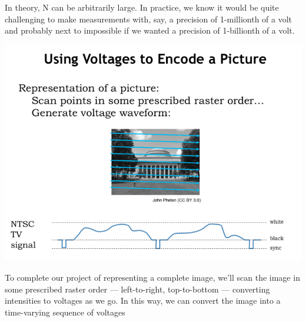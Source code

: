 \documentclass[a4paper,twoside]{article}
\numberwithin{equation}{section}
\begin{document}
In theory, N can be arbitrarily large. In practice, we know it would be quite challenging to make
measurements with, say, a precision of 1-millionth of a volt and probably next to impossible if we
wanted a precision of 1-billionth of a volt.
\begin{center}
    \includegraphics[scale=0.4]{assets/info_voltage1.png}
\end{center}
To complete our project of representing a complete image, we'll scan the image in some prescribed
raster order — left-to-right, top-to-bottom — converting intensities to voltages as we go.
In this way, we can convert the image into a time-varying sequence of voltages
\end{document}
